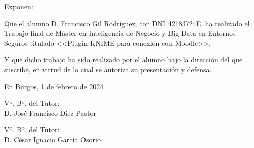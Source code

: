 \documentclass[a4paper,12pt,twoside]{memoir}
\newcommand{\nombre}{Francisco Gil Rodríguez} %
\newcommand{\titulo}{Plugin KNIME para conexión con Moodle}
\newcommand{\nombretutor}{José Francisco Díez Pastor}
\newcommand{\nombrecotutor}{César Ignacio García Osorio}
\newcommand{\fecha}{1 de febrero de 2024}
\begin{document}
\noindent Exponen:

\noindent Que el alumno D. \nombre, con DNI 42183724E, ha realizado el Trabajo final de Máster en Inteligencia de Negocio y Big Data en Entornos Seguros
          titulado <<\titulo>>.

\noindent Y que dicho trabajo ha sido realizado por el alumno bajo la dirección del que suscribe, en virtud de lo cual se autoriza su presentación y defensa.

\begin{center} %
En Burgos, {\large \fecha}
\end{center}

\vfill\vfill\vfill

\begin{minipage}{0.45\textwidth}
\begin{flushleft} %
Vº. Bº. del Tutor:\\[2cm]
D. \nombretutor
\end{flushleft}
\end{minipage}
\hfill
\begin{minipage}{0.45\textwidth}
\begin{flushleft} %
Vº. Bº. del Tutor:\\[2cm]
D. \nombrecotutor
\end{flushleft}
\end{minipage}
\hfill

\vfill


\newpage\null\thispagestyle{empty}\newpage



\frontmatter

\renewcommand*\abstractname{Resumen}
\begin{abstract}

KNIME es una plataforma de código abierto orientada al análisis de datos que permite, a través de una interfaz intuitiva y visual, 
crear análisis complejos y flujos de trabajo mediante componentes especializados en diferentes áreas como la minería de datos, 
el aprendizaje automático o la visualización de datos. Moodle es una plataforma de aprendizaje (Learning Management System) ampliamente 
utilizada por instituciones educativas de todo el mundo. En este trabajo se han desarrollado nuevos componentes de KNIME que permiten la 
integración en flujos de trabajo de KNIME de los datos que Moodle va registrando durante la ejecución de una acción formativa. 
Con un enfoque orientado al rol de profesor, se pretende que cualquier usuario con este rol dentro de una 
plataforma Moodle, pueda realizar estudios externos sobre los datos de las acciones formativas a las que tiene acceso. 
Adicionalmente, y a modo de presentación de los componentes desarrollados, se ha implementado un flujo de trabajo en KNIME 
sobre datos reales extraidos de Moodle, analizando diferentes técnicas de aprendizaje automático supervisado. 

\end{abstract}
\end{document}
